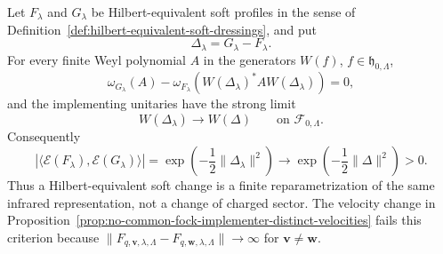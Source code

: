 \begin{proposition}
\label{prop:hilbert-soft-changes-inner-weyl-coordinate}
Let \(F_{\lambda}\) and \(G_{\lambda}\) be Hilbert-equivalent soft profiles in
the sense of Definition~\ref{def:hilbert-equivalent-soft-dressings}, and put
\[
  \Delta_{\lambda}=G_{\lambda}-F_{\lambda}.
\]
For every finite Weyl polynomial \(A\) in the generators \(W(f)\),
\(f\in\mathfrak h_{0,\Lambda}\),
\begin{equation}
  \omega_{G_{\lambda}}(A)
  -
  \omega_{F_{\lambda}}\!\left(
    W(\Delta_{\lambda})^* A W(\Delta_{\lambda})
  \right)
  =
  0 ,
  \label{eq:finite-cutoff-soft-coordinate-inner-equality}
\end{equation}
and the implementing unitaries have the strong limit
\[
  W(\Delta_{\lambda})
  \longrightarrow
  W(\Delta)
  \qquad\text{on }\mathcal F_{0,\Lambda}.
\]
Consequently
\[
  |\langle\mathcal E(F_{\lambda}),\mathcal E(G_{\lambda})\rangle|
  =
  \exp\!\left(-\frac12\|\Delta_{\lambda}\|^2\right)
  \longrightarrow
  \exp\!\left(-\frac12\|\Delta\|^2\right)>0 .
\]
Thus a Hilbert-equivalent soft change is a finite reparametrization of the
same infrared representation, not a change of charged sector.  The velocity
change in
Proposition~\ref{prop:no-common-fock-implementer-distinct-velocities} fails
this criterion because
\(\|F_{q,\mathbf v,\lambda,\Lambda}
-F_{q,\mathbf w,\lambda,\Lambda}\|\to\infty\) for
\(\mathbf v\ne\mathbf w\).
\end{proposition}


